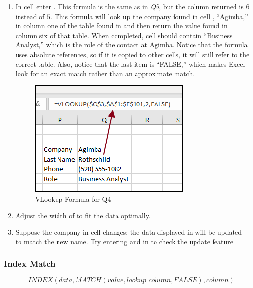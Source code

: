 \begin{enumbox}
\begin{enumerate}
		\item In cell  enter . This formula is the same as in \textit{Q5}, but the column returned is $ 6 $ instead of $ 5 $. This formula will look up the company found in cell , ``Agimba,'' in column one of the table found in  and then return the value found in column six of that table. When completed, cell  should contain ``Business Analyst,'' which is the role of the contact at Agimba.  Notice that the formula uses absolute references, so if it is copied to other cells, it will still refer to the correct table. Also, notice that the last item is ``FALSE,'' which makes Excel look for an exact match rather than an approximate match.
		
		\begin{figure}[H]
			\centering
			\includegraphics[width=\maxwidth{.75\linewidth}]{gfx/ch09_fig36}
			\caption{VLookup Formula for Q4}
			\label{09:fig36}
		\end{figure}
		
		\item Adjust the width of  to fit the data optimally.

		\item Suppose the company in cell  changes; the data displayed in  will be updated to match the new name. Try entering  and  in  to check the update feature.
	\end{enumerate}
\end{enumbox}
	
\subsubsection{Index Match}

\[ =INDEX(data,MATCH(value,lookup\_column,FALSE),column) \]

